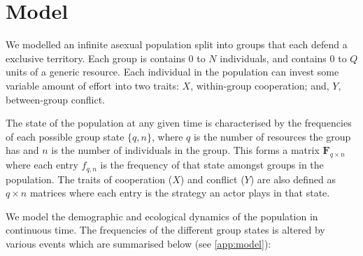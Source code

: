\section{Model}
We modelled an infinite asexual population split into groups that each defend a exclusive territory. Each group is contains $0$ to $N$ individuals, and contains $0$ to $Q$ units of a generic resource. Each individual in the population can invest some variable amount of effort into two traits: $X$, within-group cooperation; and, $Y$, between-group conflict. 

The state of the population at any given time is characterised by the frequencies of each possible group state $\{q, n\}$, where $q$ is the number of resources the group has and $n$ is the number of individuals in the group. This forms a matrix $\mathbf{F}_{q\times n}$ where each entry $f_{q,n}$ is the frequency of that state amongst groups in the population. The traits of cooperation ($X$) and conflict ($Y$) are also defined as $q\times n$ matrices where each entry is the strategy an actor plays in that state. 

We model the demographic and ecological dynamics of the population in continuous time. The frequencies of the different group states is altered by various events which are summarised below (see \cref{app:model}):

